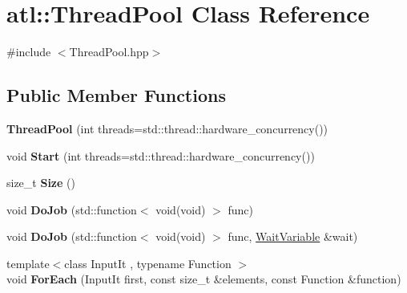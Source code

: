 \hypertarget{classatl_1_1_thread_pool}{\section{atl\+:\+:Thread\+Pool Class Reference}
\label{classatl_1_1_thread_pool}
}


{\ttfamily \#include $<$Thread\+Pool.\+hpp$>$}

\subsection*{Public Member Functions}
\begin{DoxyCompactItemize}
\item 
\hypertarget{classatl_1_1_thread_pool_a02ca8a74131b65469a77d09637971865}{{\bfseries Thread\+Pool} (int threads=std\+::thread\+::hardware\+\_\+concurrency())}\label{classatl_1_1_thread_pool_a02ca8a74131b65469a77d09637971865}

\item 
\hypertarget{classatl_1_1_thread_pool_a96599097f0e7ac0665b16ea23cd5d014}{void {\bfseries Start} (int threads=std\+::thread\+::hardware\+\_\+concurrency())}\label{classatl_1_1_thread_pool_a96599097f0e7ac0665b16ea23cd5d014}

\item 
\hypertarget{classatl_1_1_thread_pool_afaaedabb66c24d2dffadad1a17ee326e}{size\+\_\+t {\bfseries Size} ()}\label{classatl_1_1_thread_pool_afaaedabb66c24d2dffadad1a17ee326e}

\item 
\hypertarget{classatl_1_1_thread_pool_a98a69f6bc963f87dcde08db1f30a24c8}{void {\bfseries Do\+Job} (std\+::function$<$ void(void) $>$ func)}\label{classatl_1_1_thread_pool_a98a69f6bc963f87dcde08db1f30a24c8}

\item 
\hypertarget{classatl_1_1_thread_pool_ab11df304a64fb8d887f4fe2ef7fc66f9}{void {\bfseries Do\+Job} (std\+::function$<$ void(void) $>$ func, \hyperlink{classatl_1_1_wait_variable}{Wait\+Variable} \&wait)}\label{classatl_1_1_thread_pool_ab11df304a64fb8d887f4fe2ef7fc66f9}

\item 
\hypertarget{classatl_1_1_thread_pool_a6096504a6d4a74ec14ca8235ab9615b5}{{\footnotesize template$<$class Input\+It , typename Function $>$ }\\void {\bfseries For\+Each} (Input\+It first, const size\+\_\+t \&elements, const Function \&function)}\label{classatl_1_1_thread_pool_a6096504a6d4a74ec14ca8235ab9615b5}


\end{DoxyCompactItemize}
